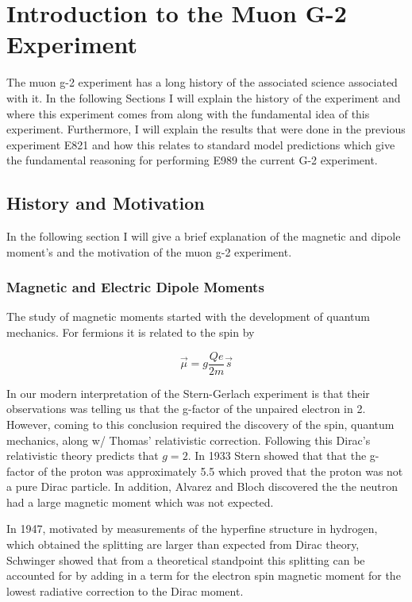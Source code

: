 \documentclass[./Thesis]{subfiles}
\begin{document}

\chapter{Introduction to the Muon G-2 Experiment}

The muon g-2 experiment has a long history of the associated science associated with it. In the following Sections I will explain the history of the experiment and where this experiment comes from along with the fundamental idea of this experiment.  Furthermore, I will explain the results that were done in the previous experiment E821 and how this relates to standard model predictions which give the fundamental reasoning for performing E989 the current G-2 experiment.

\section{History and Motivation}
In the following section I will give a brief explanation of the magnetic and dipole moment's and the motivation of the muon g-2 experiment.
\subsection{Magnetic and Electric Dipole Moments}

	The study of magnetic moments started with the development of quantum mechanics. For fermions it is related to the spin by 
	
	\begin{equation}\label{EQ:MDM}
	\vec{\mu} = g \frac{Qe}{2m} \vec{s}
	\end{equation}
	
In our modern interpretation of the Stern-Gerlach experiment is that their observations was telling us that the g-factor of the unpaired electron in 2.  However, coming to this conclusion required the discovery of the spin, quantum mechanics, along w/ Thomas' relativistic correction. Following this Dirac's relativistic theory predicts that $g=2$. In 1933 Stern showed that that the g-factor of the proton was approximately 5.5 which proved that the proton was not a pure Dirac particle. In addition, Alvarez and Bloch discovered the the neutron had a large magnetic moment which was not expected.

In 1947, motivated by measurements of the hyperfine structure in hydrogen, which obtained the splitting are larger than expected from Dirac theory, Schwinger showed that from a theoretical standpoint this splitting can be accounted for by adding in a term for the electron spin magnetic moment for the lowest radiative correction to the Dirac moment.
\end{document}
